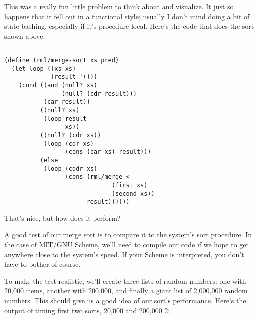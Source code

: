 \documentclass[12pt,openright,draft]{book}
\begin{document}
This was a really fun little problem to think about and visualize. It just so happens that it fell out in a functional style; usually I don't mind doing a bit of state-bashing, especially if it's procedure-local. Here's the code that does the sort shown above:

\begin{verbatim}

(define (rml/merge-sort xs pred)
  (let loop ((xs xs)
             (result '()))
    (cond ((and (null? xs)
                (null? (cdr result)))
           (car result))
          ((null? xs)
           (loop result
                 xs))
          ((null? (cdr xs))
           (loop (cdr xs)
                 (cons (car xs) result)))
          (else
           (loop (cddr xs)
                 (cons (rml/merge <
                              (first xs)
                              (second xs))
                       result))))))

\end{verbatim}

That's nice, but how does it perform?

A good test of our merge sort is to compare it to the system's sort procedure. In the case of MIT/GNU Scheme, we'll need to compile our code if we hope to get anywhere close to the system's speed. If your Scheme is interpreted, you don't have to bother of course.

To make the test realistic, we'll create three lists of random numbers: one with 20,000 items, another with 200,000, and finally a giant list of 2,000,000 random numbers. This should give us a good idea of our sort's performance. Here's the output of timing first two sorts, 20,000 and 200,000 2:
\end{document}
